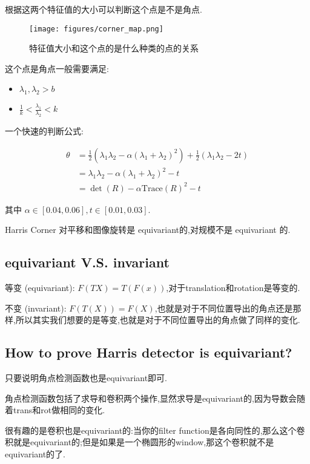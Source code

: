 根据这两个特征值的大小可以判断这个点是不是角点.

\begin{figure}[htbp]
    \centering
    \texttt{[image: figures/corner\_map.png]}
    \caption{特征值大小和这个点的是什么种类的点的关系}
\end{figure}

这个点是角点一般需要满足:

\begin{itemize}
    \item $\lambda_1, \lambda_2>b$
    \item $\frac{1}{k}<\frac{\lambda_1}{\lambda_2}<k$
\end{itemize}

一个快速的判断公式:

\begin{equation}
\begin{aligned}
\theta&=\frac 12(\lambda_1\lambda_2-\alpha(\lambda_1+\lambda_2)^2)+\frac12(\lambda_1\lambda_2-2t)\\
&=\lambda_1\lambda_2-\alpha(\lambda_1+\lambda_2)^2-t\\
&=\det(R)-\alpha\text{Trace}(R)^2-t
\end{aligned}
\end{equation}

其中 $\alpha\in[0.04,0.06], t\in[0.01,0.03]$.

Harris Corner 对平移和图像旋转是 equivariant的,对规模不是 equivariant 的.

\subsection{equivariant V.S. invariant}

等变 (equivariant): $F(TX)=T(F(x))$,对于translation和rotation是等变的.

不变 (invariant): $F(T(X))=F(X)$,也就是对于不同位置导出的角点还是那样,所以其实我们想要的是等变,也就是对于不同位置导出的角点做了同样的变化.

\subsection{How to prove Harris detector is equivariant?}

只要说明角点检测函数也是equivariant即可.

角点检测函数包括了求导和卷积两个操作,显然求导是equivariant的,因为导数会随着trans和rot做相同的变化.

很有趣的是卷积也是equivariant的:当你的filter function是各向同性的,那么这个卷积就是equivariant的;但是如果是一个椭圆形的window,那这个卷积就不是equivariant的了.

